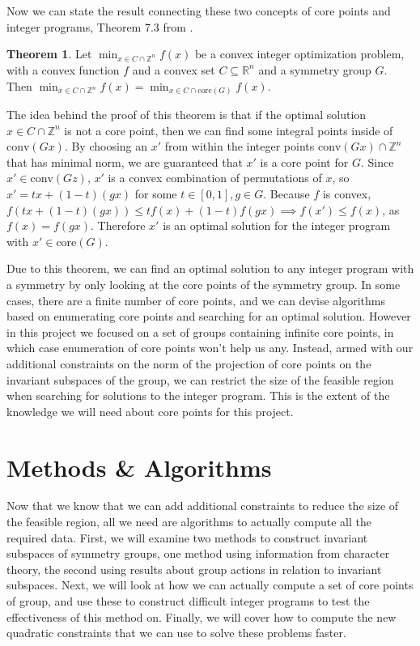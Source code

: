 \documentclass[11pt]{article} %
\theoremstyle{definition}
\newtheorem{theorem}{Theorem}[section]
\theoremstyle{remark}
\newcommand{\ZZ}{\mathbb{Z}}
\begin{document}
Now we can state the result connecting these two concepts of core points and integer programs, Theorem 7.3 from \cite{rehn}.

\begin{theorem} \label{cpclose}
Let $\min_{x \in C \cap \ZZ^n} f(x)$ be a convex integer optimization problem, with a convex function $f$ and a convex set $C \subseteq \mathbb{R}^n$ and a symmetry group $G$. Then $\min_{x \in C \cap \ZZ^n} f(x) = \min_{x \in C \cap \textrm{core}(G)} f(x)$.
\end{theorem}

The idea behind the proof of this theorem is that if the optimal solution $x \in C \cap \ZZ^n$ is not a core point, then we can find some integral points inside of $\textrm{conv}(Gx)$. By choosing an $x'$ from within the integer points $\textrm{conv}(Gx) \cap \ZZ^n$ that has minimal norm, we are guaranteed that $x'$ is a core point for $G$. Since $x' \in \textrm{conv}(Gz)$, $x'$ is a convex combination of permutations of $x$, so $x' = tx + (1-t)(gx)$ for some $t \in [0,1], g \in G$. Because $f$ is convex, $f(tx + (1-t)(gx)) \leq tf(x) + (1-t)f(gx) \implies f(x') \leq f(x)$, as $f(x) = f(gx)$. Therefore $x'$ is an optimal solution for the integer program with $x' \in \textrm{core}(G)$.

Due to this theorem, we can find an optimal solution to any integer program with a symmetry by only looking at the core points of the symmetry group. In some cases, there are a finite number of core points, and we can devise algorithms based on enumerating core points and searching for an optimal solution. However in this project we focused on a set of groups containing infinite core points, in which case enumeration of core points won't help us any. Instead, armed with our additional constraints on the norm of the projection of core points on the invariant subspaces of the group, we can restrict the size of the feasible region when searching for solutions to the integer program. This is the extent of the knowledge we will need about core points for this project.

\section{Methods \& Algorithms}

Now that we know that we can add additional constraints to reduce the size of the feasible region, all we need are algorithms to actually compute all the required data. First, we will examine two methods to construct invariant subspaces of symmetry groups, one method using information from character theory, the second using results about group actions in relation to invariant subspaces. Next, we will look at how we can actually compute a set of core points of group, and use these to construct difficult integer programs to test the effectiveness of this method on. Finally, we will cover how to compute the new quadratic constraints that we can use to solve these problems faster.
\end{document}
